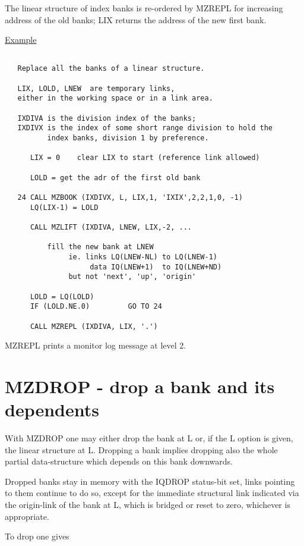 The linear structure of index banks is re-ordered by MZREPL for
increasing address of the old banks;
LIX returns the address of the new first bank.


\ul{Example}
\begin{verbatim}

   Replace all the banks of a linear structure.

   LIX, LOLD, LNEW  are temporary links,
   either in the working space or in a link area.

   IXDIVA is the division index of the banks;
   IXDIVX is the index of some short range division to hold the
          index banks, division 1 by preference.

      LIX = 0    clear LIX to start (reference link allowed)

      LOLD = get the adr of the first old bank

   24 CALL MZBOOK (IXDIVX, L, LIX,1, 'IXIX',2,2,1,0, -1)
      LQ(LIX-1) = LOLD

      CALL MZLIFT (IXDIVA, LNEW, LIX,-2, ...

          fill the new bank at LNEW
               ie. links LQ(LNEW-NL) to LQ(LNEW-1)
                    data IQ(LNEW+1)  to IQ(LNEW+ND)
               but not 'next', 'up', 'origin'

      LOLD = LQ(LOLD)
      IF (LOLD.NE.0)         GO TO 24

      CALL MZREPL (IXDIVA, LIX, '.')
\end{verbatim} 

MZREPL prints a monitor log message at level 2.

\section{MZDROP - drop a bank and its dependents}

With MZDROP one may either drop the bank at L or,
if the L option is given, the linear structure at L.
Dropping a bank implies dropping also the whole partial
data-structure which depends on this bank downwards.

Dropped banks stay in memory with the IQDROP status-bit set,
links pointing to them continue to do so,
except for the immediate structural link indicated via the
origin-link of the bank at L, which is bridged or reset to zero,
whichever is appropriate.

To drop one gives

